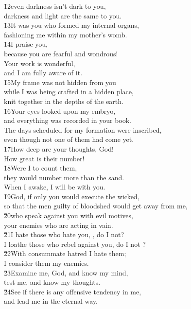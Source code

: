 \begin{poetry}
\poeml \v{12}even darkness isn't dark to you, \\
\poemll    darkness and light are the same to you. \\
\poeml \v{13}It was you who formed my internal organs, \\
\poemll    fashioning me within my mother's womb. \\
\poeml \v{14}I praise you, \\
\poemll    because you are fearful and wondrous! \\
\poeml Your work is wonderful, \\
\poemll    and I am fully aware of it. \\
\poeml \v{15}My frame was not hidden from you \\
\poemll    while I was being crafted in a hidden place, \\
\poemlll       knit together in the depths of the earth. \\
\poeml \v{16}Your eyes looked upon my embryo, \\
\poemll    and everything was recorded in your book. \\
\poeml The days scheduled for my formation were inscribed, \\
\poemll    even though not one of them had come yet. \\
\poeml \v{17}How deep are your thoughts, God! \\
\poemll    How great is their number! \\
\poeml \v{18}Were I to count them, \\
\poemll    they would number more than the sand. \\
\poemlll       When I awake, I will be with you. \\
\poeml \v{19}God, if only you would execute the wicked, \\
\poemll    so that the men guilty of bloodshed would get away from me, \\
\poeml \v{20}who speak against you with evil motives, \\
\poemll    your enemies who are acting in vain. \\
\poeml \v{21}I hate those who hate you, , do I not? \\
\poemll    I loathe those who rebel against you, do I not ? \\
\poeml \v{22}With consummate hatred I hate them; \\
\poemll    I consider them my enemies. \\
\poeml \v{23}Examine me, God, and know my mind, \\
\poemll    test me, and know my thoughts. \\
\poeml \v{24}See if there is any offensive tendency in me, \\
\poemll    and lead me in the eternal way.
\end{poetry}
